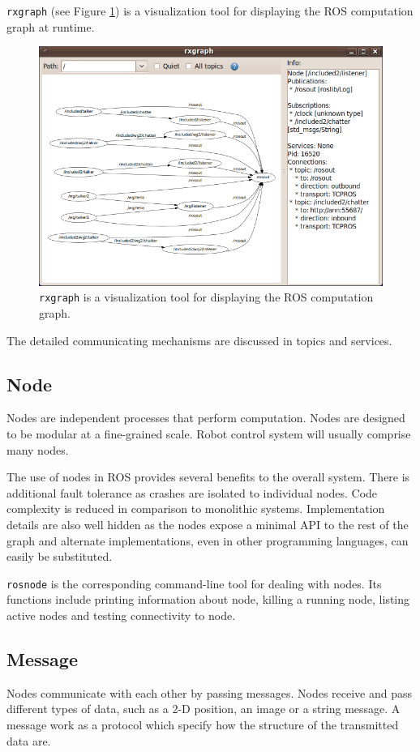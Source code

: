 \documentclass[a4paper, 10pt, conference]{ieeeconf}       %
\begin{document}
\texttt{rxgraph} (see Figure \ref{fig:rxgraph}) is a visualization tool for displaying the ROS computation graph at runtime.

\begin{figure}[htpb]
  \centering
  \includegraphics[width=.48\textwidth]{rxgraph}
  \caption{\texttt{rxgraph} is a visualization tool for displaying the ROS computation graph.}
  \label{fig:rxgraph}
\end{figure}

The detailed communicating mechanisms are discussed in topics and services.

\subsection{Node} 

Nodes are independent processes that perform computation. Nodes are designed to be modular at a fine-grained scale. Robot control system will usually comprise many nodes.

The use of nodes in ROS provides several benefits to the overall system. There is additional fault tolerance as crashes are isolated to individual nodes. Code complexity is reduced in comparison to monolithic systems. Implementation details are also well hidden as the nodes expose a minimal API to the rest of the graph and alternate implementations, even in other programming languages, can easily be substituted.

\texttt{rosnode} is the corresponding command-line tool for dealing with nodes. Its functions include printing information about node, killing a running node, listing active nodes and testing connectivity to node.

\subsection{Message}

Nodes communicate with each other by passing messages. Nodes receive and pass different types of data, such as a 2-D position, an image or a string message. A message work as a protocol which specify how the structure of the transmitted data are.
\end{document}
